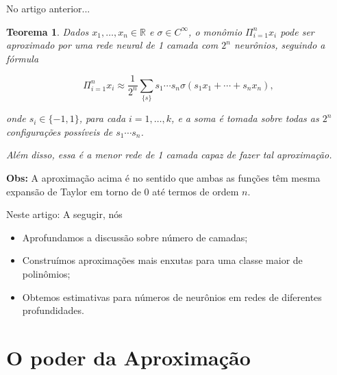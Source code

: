\documentclass{beamer}
\newtheorem{teo}{Teorema}[section]
\theoremstyle{definition}
\begin{document}
\begin{frame}{No artigo anterior...}
    \begin{teo}

    Dados $x_1,\dots,x_n \in \mathbb R$ e $\sigma \in C^\infty$, o monômio $\Pi_{i=1}^n x_i$ pode ser aproximado por uma rede neural de 1 camada com $2^n$ neurônios, seguindo a fórmula

    \[
        \Pi_{i=1}^n x_i \approx \frac{1}{2^n} \sum_{\{s\}}s_1 \cdots s_n \sigma(s_1 x_1 + \cdots + s_n x_n),
    \]

    onde $s_i \in \{-1,1\}$, para cada $i = 1,\dots,k$, e a soma é tomada sobre todas as $2^n$ configurações possíveis de $s_1 \cdots s_n$.

    Além disso, essa é a menor rede de 1 camada capaz de fazer tal aproximação.
    
    \end{teo}

    \textbf{Obs:} A aproximação acima é no sentido que ambas as funções têm mesma expansão de Taylor em torno de 0 até termos de ordem $n$.

\end{frame}

\begin{frame}{Neste artigo:}
    A segugir, nós
    \begin{itemize}
        \item Aprofundamos a discussão sobre número de camadas; \pause
        \item Construímos aproximações mais enxutas para uma classe maior de polinômios; \pause
        \item Obtemos estimativas para números de neurônios em redes de diferentes profundidades.
    \end{itemize}

\end{frame}

\section{O poder da Aproximação}
\begin{frame}
    \tableofcontents[currentsection]
\end{frame}
\end{document}
